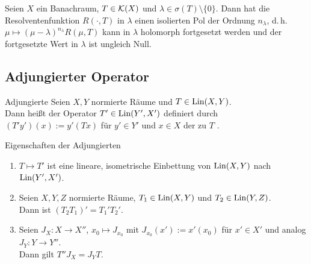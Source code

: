 \linie

\begin{Kor}
    Seien $X$ ein Banachraum, $T \in \mathcal{K}(X)$ und $\lambda \in \sigma(T) \setminus \{0\}$.
    Dann hat die Resolventenfunktion $R(\cdot, T)$ in $\lambda$ einen isolierten Pol
    der Ordnung $n_\lambda$, d.\,h.
    $\mu \mapsto (\mu - \lambda)^{n_\lambda} R(\mu, T)$ kann in $\lambda$ holomorph fortgesetzt
    werden und der fortgesetzte Wert in $\lambda$ ist ungleich Null.
\end{Kor}

\pagebreak

\subsection{%
    Adjungierter Operator%
}

\begin{Def}{Adjungierte}
    Seien $X, Y$ normierte Räume und $T \in \operatorname{Lin}(X, Y)$.\\
    Dann heißt der Operator $T' \in \operatorname{Lin}(Y', X')$ definiert durch
    $(T'y')(x) := y'(Tx)$ für $y' \in Y'$ und $x \in X$ der zu $T$ .
\end{Def}

\begin{Satz}{Eigenschaften der Adjungierten}
    \begin{enumerate}
        \item
        $T \mapsto T'$ ist eine lineare, isometrische Einbettung
        von $\operatorname{Lin}(X, Y)$ nach $\operatorname{Lin}(Y', X')$.
        
        \item
        Seien $X, Y, Z$ normierte Räume, $T_1 \in \operatorname{Lin}(X, Y)$ und $T_2 \in \operatorname{Lin}(Y, Z)$.\\
        Dann ist $(T_2 T_1)' = T_1' T_2'$.
        
        \item
        Seien $J_X\colon X \rightarrow X''$, $x_0 \mapsto J_{x_0}$ mit
        $J_{x_0}(x') := x'(x_0)$ für $x' \in X'$ und analog $J_Y\colon Y \rightarrow Y''$.\\
        Dann gilt $T'' J_X = J_Y T$.
    \end{enumerate}
\end{Satz}

